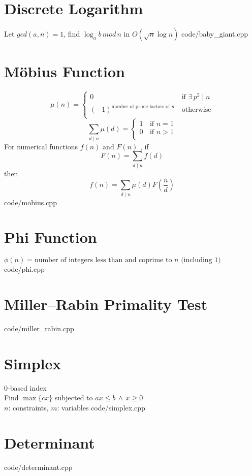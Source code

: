 \documentclass [landscape,8pt,a4paper,twocolumn]{article}
\begin{document}
\section{Discrete Logarithm}
Let $ gcd(a, n)=1 $, find $ \log_{a}{b} \, mod \, n $ in $ O(\sqrt{n}\log{n}) $
 {code/baby_giant.cpp}

\section{Möbius Function}
\[\mu (n) =
 	\begin{cases}
		0	& \, \text{if } \exists \, p^2 \mid n \\
		(-1)^{\text{number of prime factors of } n}	& \, \text{otherwise} \\
	\end{cases}
\]
\[\sum_{d \mid n} \mu(d) =
	\begin{cases}
    	1	& \, \text{if } n=1 \\
        0	& \, \text{if } n>1 \\
	\end{cases}
\]
For numerical functions $ f(n) \text{ and } F(n) $ , if
\[
	F(n)=\sum_{d \mid n}f(d)
\]
then
\[
	f(n)=\sum_{d \mid n}\mu(d)F(\frac{n}{d})
\]
 {code/mobius.cpp}

\section{Phi Function}
$ \phi(n)= \text{number of integers less than and coprime to } n \text{ (including } 1) $
 {code/phi.cpp}

\section{Miller–Rabin Primality Test}
 {code/miller_rabin.cpp}

\vfill\null

\section{Simplex}
0-based index \\
Find $ \max\{cx\} $ subjected to $ ax \leq b \, \wedge \, x \geq 0 $ \\
$ n $: constraints, $ m $: variables
 {code/simplex.cpp}

\section{Determinant}
 {code/determinant.cpp}
\end{document}
